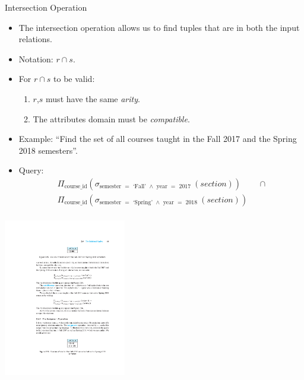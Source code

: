 \documentclass{beamer}
\begin{document}
\begin{frame}{Intersection Operation}
    \begin{itemize}
        \item The intersection operation allows us to find tuples that are in both the input relations.
        \item Notation: {\Large $r \cap s$}.
        \item For $r \cap s$ to be valid:
        \begin{enumerate}
            \item $r$,$s$ must have the same \textit{arity}.
            \item The attributes domain must be \textit{compatible}.
        \end{enumerate}
        \item Example: ``Find the set of all courses taught in the Fall 2017 and the Spring 2018 semesters''.
        \item Query:
        \begin{equation*}
            \begin{split}
                \Pi_{\text{course\_id}} (\sigma_{ \text{semester } = \text{ `Fall' } \wedge \text{ year } = \text{ 2017 } } (section) ) & \text{ } \cap \\
                \Pi_{\text{course\_id}} (\sigma_{ \text{semester } = \text{ `Spring' } \wedge \text{ year } = \text{ 2018 } } (section) ) & \\
            \end{split}
        \end{equation*}
    \end{itemize}
    \centering
    \includegraphics[width=0.40\textwidth, trim={9.50cm 21.50cm 8.00cm 4.50cm}, clip]{figures/db_intersection}    
\end{frame}
\end{document}
